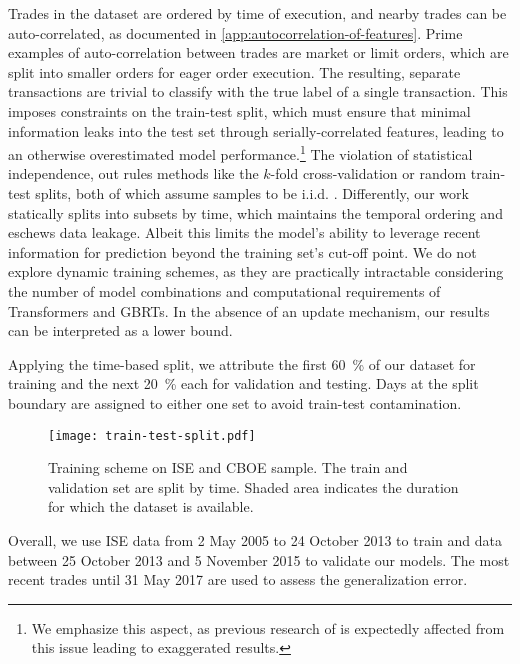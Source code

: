 Trades in the dataset are ordered by time of execution, and nearby trades can be auto-correlated, as documented in \cref{app:autocorrelation-of-features}.
Prime examples of auto-correlation between trades are market or limit orders, which are split into smaller orders for eager order execution. 
The resulting, separate transactions are trivial to classify with the true label of a single transaction. This imposes constraints on the train-test split, which must ensure that minimal information leaks into the test set through serially-correlated features, leading to an otherwise overestimated model performance.\footnote{We emphasize this aspect, as previous research of \textcite[][14]{ronenMachineLearningTrade2022} is expectedly affected from this issue leading to exaggerated results.} The violation of statistical independence, out rules methods like the $k$-fold cross-validation or random train-test splits, both of which assume samples to be i.i.d. \autocite[][103--105]{lopezdepradoAdvancesFinancialMachine2018}. Differently, our work statically splits into subsets by time, which maintains the temporal ordering and eschews data leakage. Albeit this limits the model's ability to leverage recent information for prediction beyond the training set's cut-off point. We do not explore dynamic training schemes, as they are practically intractable considering the number of model combinations and computational requirements of Transformers and \glspl{GBRT}. In the absence of an update mechanism, our results can be interpreted as a lower bound.

Applying the time-based split, we attribute the first \SI{60}{\percent} of our dataset for training and the next \SI{20}{\percent} each for validation and testing. Days at the split boundary are assigned to either one set to avoid train-test contamination.

\begin{figure}[ht]
    \centering
    \texttt{[image: train-test-split.pdf]}
    \caption[Training Scheme on  and  Sample]{Training scheme on \gls{ISE} and \gls{CBOE} sample. The train and validation set are split by time. Shaded area  indicates the duration for which the dataset is available.}
    \label{fig:train-test-split}
\end{figure}

Overall, we use \gls{ISE} data from 2 May 2005 to 24 October 2013 to train and data between 25 October 2013 and 5 November 2015 to validate our models. The most recent trades until 31 May 2017 are used to assess the generalization error.

